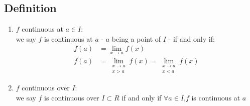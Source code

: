\documentclass[notitlepage]{math}
\begin{document}
\subsection{Definition}
\begin{enumerate}[label=\protect\circled{\arabic*}]
    \item $f$ continuous at $a \in I$: \\ we say $f$ is continuous at $a$ - $a$ being a point of $I$ - if and only if:
    \begin{align*}
        f(a) &= \lim_{x \to a} f(x) \\
        f(a) &= \lim_{\begin{smallmatrix}
            x \to a \\
            x > a
        \end{smallmatrix}}f(x) = \lim_{\begin{smallmatrix}
            x \to a \\
            x < a
        \end{smallmatrix}}f(x) 
    \end{align*}
    \item $f$ continuous over $I$: \\ we say $f$ is continuous over $I \subset R$ if and only if $\forall a \in I$,$f$ is continuous at $a$
\end{enumerate}
\end{document}
